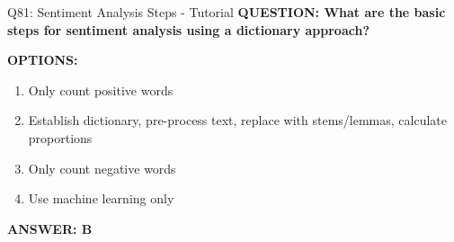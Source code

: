 \documentclass[8pt]{beamer}
\begin{document}
	
	\begin{frame}{Q81: Sentiment Analysis Steps - Tutorial}
		\fontsize{6.5}{7.5}\selectfont
		\textbf{QUESTION: What are the basic steps for sentiment analysis using a dictionary approach?}
		
		\vspace{0.1cm}
		\textbf{OPTIONS:}
		\begin{enumerate}
			\item Only count positive words
			\item Establish dictionary, pre-process text, replace with stems/lemmas, calculate proportions
			\item Only count negative words
			\item Use machine learning only
		\end{enumerate}
		
		\vspace{0.1cm}
		\textcolor{myblue}{\textbf{ANSWER: B}}
		

\end{frame}
\end{document}
